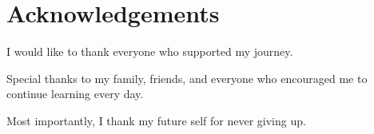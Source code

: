 \chapter*{Acknowledgements}

I would like to thank everyone who supported my journey.

Special thanks to my family, friends, and everyone who encouraged me to continue learning every day.

Most importantly, I thank my future self for never giving up.

\clearpage